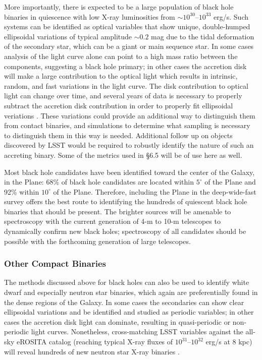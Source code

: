 More importantly, there is expected to be a large population of black hole
binaries in quiescence with low X-ray luminosities from $\sim
10^{30}$--$10^{33}$ erg/s.  Such systems can be identified as optical variables
that show unique, double-humped ellipsoidal variations of typical amplitude
$\sim 0.2$ mag due to the tidal deformation of the secondary star, which can be
a giant or main sequence star. In some cases analysis of the light curve alone
can point to a high mass ratio between the components, suggesting a black hole
primary; in other cases the accretion disk will make a large contribution to
the optical light which results in intrinsic, random, and fast variations in
the light curve. The disk contribution to optical light can change over time,
and several years of data is necessary to properly subtract the accretion disk
contribution in order to properly fit ellipsoidal veriations
\citep{2010ApJ...710.1127C}.  These variations could provide an additional way
to distinguish them from contact binaries, and simulations to determine what
sampling is necessary to distinguish them in this way is needed. Additional
follow up on objects discovered by LSST would be required to robustly identify
the nature of such an accreting binary. Some of the metrics used in \S 6.5 will
be of use here as well. 

Most black hole candidates have been identified toward the center of the Galaxy, in the Plane: 68\% of black hole candidates are located within $5^{\circ}$ of the Plane and 92\% within $10^{\circ}$ of the Plane. Therefore, including the Plane in the deep-wide-fast survey offers the best route to identifying the hundreds of quiescent black hole binaries that should be present. The brighter sources will be amenable to spectroscopy with the current generation of 4-m to 10-m telescopes to dynamically confirm new black holes; spectroscopy of all candidates should be possible with the forthcoming generation of large telescopes.

\subsubsection{Other Compact Binaries}

The methods discussed above for black holes can also be used to identify white
dwarf and especially neutron star binaries, which again are preferentially
found in the dense regions of the Galaxy.  In some cases the secondaries can
show clear ellipsoidal variations and be identified and studied as periodic
variables; in other cases the accretion disk light can dominate, resulting in
quasi-periodic or non-periodic light curves. Nonetheless, cross-matching LSST
variables against the all-sky eROSITA catalog (reaching typical X-ray fluxes of
$10^{31}$--$10^{32}$ erg/s at 8 kpc) will reveal hundreds of new neutron star
X-ray binaries \citep{2012arXiv1209.3114M}.


